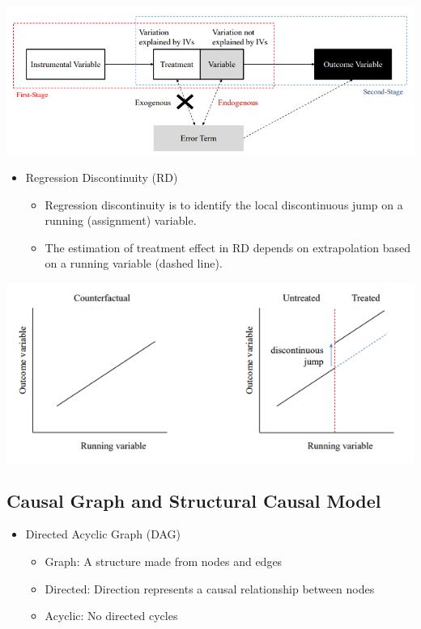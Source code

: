 \documentclass[
]{book}
\providecommand{\tightlist}{%
  \setlength{\itemsep}{0pt}\setlength{\parskip}{0pt}}
\theoremstyle{definition}
\theoremstyle{definition}
\theoremstyle{definition}
\theoremstyle{definition}
\theoremstyle{remark}
\begin{document}
\includegraphics{figures/33.png}

\begin{itemize}
\tightlist
\item
  Regression Discontinuity (RD)

  \begin{itemize}
  \tightlist
  \item
    Regression discontinuity is to identify the local discontinuous jump on a running (assignment) variable.
  \item
    The estimation of treatment effect in RD depends on extrapolation based on a running variable (dashed line).
  \end{itemize}
\end{itemize}

\includegraphics{figures/34.png}

\hypertarget{causal-graph-and-structural-causal-model}{%
\subsection{Causal Graph and Structural Causal Model}\label{causal-graph-and-structural-causal-model}}

\begin{itemize}
\tightlist
\item
  Directed Acyclic Graph (DAG)

  \begin{itemize}
  \tightlist
  \item
    Graph: A structure made from nodes and edges
  \item
    Directed: Direction represents a causal relationship between nodes
  \item
    Acyclic: No directed cycles
  \end{itemize}
\end{itemize}
\end{document}
